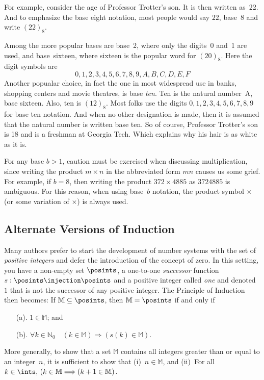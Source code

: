 For example, consider the age of Professor Trotter's son. It is then written
as~22.  And to emphasize the base eight notation, most people would
say $22$, base~$8$ and write $(22)_8$.  

Among the more popular bases are base~2, where only the digits~0 and~1
are used, and base~sixteen, where sixteen is the popular word for 
$(20)_8$.  Here the digit symbols are
\[
0,1,2,3,4,5,6,7,8,9,A,B,C,D,E,F
\]
Another popualar choice, in fact the one in most widespread use
in banks, shopping centers and movie theatres, is base \textit{ten}.
Ten is the natural number~A, base sixteen.  Also, ten is $(12)_8$.
Most folks use the digits $0,1,2,3,4,5,6,7,8,9$ for base ten
notation.  And when no other designation is made, then it is assumed
that the natural number is written base ten.  So of course, Professor
Trotter's son is 18 and is a freshman at Georgia Tech.  Which explains
why his hair is as white as it is.

For any base $b>1$, caution must be exercised when discussing 
multiplication, since writing the product $m\times n$ in the 
abbreviated form $mn$ causes us some grief.  For example, if $b = 8$,
then writing the product $372\times4885$ as $3724885$ is
ambiguous.  For this reason, when using base~$b$ notation, the
product symbol $\times$ (or some variation of $\times$)
is always used.

\subsection{Alternate Versions of Induction}

Many authors prefer to start the development of number systems
with the set of \textit{positive integers} and defer the
introduction of the concept of zero.  In this setting,
you have a non-empty set $\posints$, a one-to-one 
\textit{successor} function $s:\posints\injection\posints$ and
a positive integer called \textit{one} and denoted~$1$ that
is not the successor of any positive integer.  The Principle of
Induction then becomes:  If $\mathbb{M}\subseteq\posints$, 
then $\mathbb{M} =\posints$ if and only if
\begin{enumerate}
\item[(a).] $1\in \mathbb{M}$; and 
\item[(b).] $\forall k\in \mathbb{N}_0\quad(k\in \mathbb{M}) 
  \Longrightarrow(s(k)\in \mathbb{M})$. 
\end{enumerate}

More generally, to show that a set $\mathbb{M}$ contains
all integers greater than or equal to an integer~$n$, it is
sufficient to show that (i)~$n\in\mathbb{M}$, and (ii)~For
all $k\in\ints,\,(k\in\mathbb{M}\Longrightarrow(k+1\in\mathbb{M})$.

